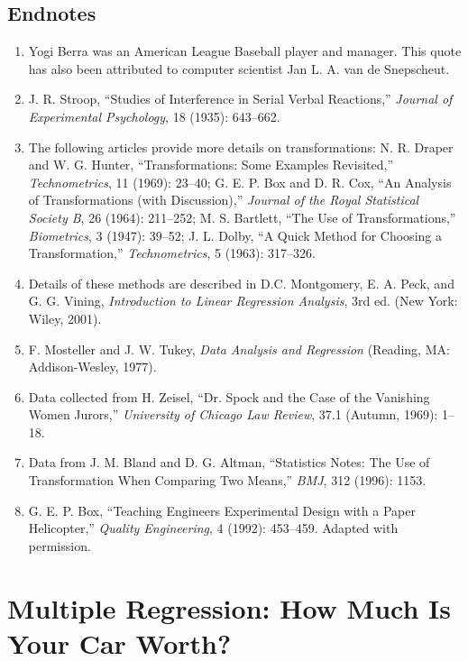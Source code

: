 \documentclass[
]{report}
\begin{document}
\hypertarget{endnotes}{%
\section*{\texorpdfstring{\textbf{Endnotes}}{Endnotes}}\label{endnotes}}

\begin{enumerate}
  \item Yogi Berra was an American League Baseball player and manager. This quote has also been attributed to computer scientist Jan L. A. van de Snepscheut.
  \item J. R. Stroop, “Studies of Interference in Serial Verbal Reactions,” \textit{Journal of Experimental Psychology}, 18 (1935): 643–662.
  \item The following articles provide more details on transformations: N. R. Draper and W. G. Hunter, “Transformations: Some Examples Revisited,” \textit{Technometrics}, 11 (1969): 23–40; G. E. P. Box and D. R. Cox, “An Analysis of Transformations (with Discussion),” \textit{Journal of the Royal Statistical Society B}, 26 (1964): 211–252; M. S. Bartlett, “The Use of Transformations,” \textit{Biometrics}, 3 (1947): 39–52; J. L. Dolby, “A Quick Method for Choosing a Transformation,” \textit{Technometrics}, 5 (1963): 317–326.
  \item Details of these methods are described in D.C. Montgomery, E. A. Peck, and G. G. Vining, \textit{Introduction to Linear Regression Analysis}, 3rd ed. (New York: Wiley, 2001).
  \item F. Mosteller and J. W. Tukey, \textit{Data Analysis and Regression} (Reading, MA: Addison-Wesley, 1977).
  \item Data collected from H. Zeisel, “Dr. Spock and the Case of the Vanishing Women Jurors,” \textit{University of Chicago Law Review}, 37.1 (Autumn, 1969): 1–18.
  \item Data from J. M. Bland and D. G. Altman, “Statistics Notes: The Use of Transformation When Comparing Two Means,” \textit{BMJ}, 312 (1996): 1153.
  \item G. E. P. Box, “Teaching Engineers Experimental Design with a Paper Helicopter,” \textit{Quality Engineering}, 4 (1992): 453–459. Adapted with permission.
\end{enumerate}

\hypertarget{multiple-regression-how-much-is-your-car-worth}{%
\chapter{Multiple Regression: How Much Is Your Car Worth?}\label{multiple-regression-how-much-is-your-car-worth}}
\end{document}
